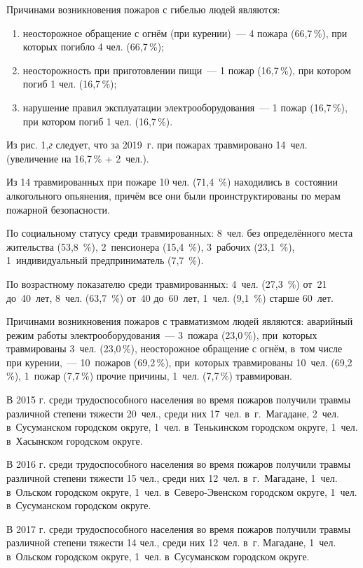 Причинами возникновения пожаров с гибелью людей являются:
\begin{enumerate}[noitemsep]\vspace{-8pt}
\item неосторожное обращение с огнём (при курении)~--- 4 пожара (66,7\,\%), при которых погибло 4 чел. (66,7\,\%);
\item неосторожность при приготовлении пищи~--- 1 пожар (16,7\,\%), при котором погиб 1 чел. (16,7\,\%);
\item нарушение правил эксплуатации электрооборудования~--- 1 пожар (16,7\,\%), при котором погиб 1 чел. (16,7\,\%).
\end{enumerate}
\vspace{-6pt}

Из рис. 1,\textit{г} следует, что за 2019~г. при пожарах травмировано 14~чел. (увеличение на 16,7\,\% + 2~чел.).

Из 14 травмированных при пожаре 10 чел. (71,4~\%) находились в~состоянии
алкогольного опьянения, причём все они были проинструктированы по мерам
пожарной безопасности.

По социальному статусу среди травмированных: 8~чел. без определённого
места жительства (53,8~\%), 2~пенсионера (15,4~\%), 3~рабочих (23,1~\%), 1~индивидуальный предприниматель (7,7~\%).

По возрастному показателю среди травмированных: 4~чел. (27,3~\%) от~21 до~40~лет, 8~чел. (63,7~\%) от~40 до~60~лет, 1~чел. (9,1~\%) старше 60~лет.

Причинами возникновения пожаров с травматизмом людей являются: аварийный режим работы электрооборудования~--- 3~пожара (23,0\,\%), при~которых травмированы 3~чел. (23,0\,\%), неосторожное обращение с огнём, в~том числе при курении,~--- 10~пожаров (69,2\,\%), при~которых травмированы 10~чел. (69,2\,\%), 1~пожар (7,7\,\%) прочие причины, 1~чел. (7,7\,\%) травмирован.

В 2015 г. среди трудоспособного населения во время пожаров получили травмы различной степени тяжести 20~чел., среди них 17~чел. в~г.~Магадане, 2~чел. в~Сусуманском городском округе, 1~чел. в~Тенькинском городском округе, 1~чел. в~Хасынском городском округе.

В 2016 г. среди трудоспособного населения во время пожаров получили травмы различной степени тяжести 15 чел., среди них 12~чел. в~г.~Магадане, 1~чел. в~Ольском городском округе, 1~чел. в~Северо-Эвенском городском округе, 1~чел. в~Сусуманском городском округе.

В 2017 г. среди трудоспособного населения во время пожаров получили травмы различной степени тяжести 14 чел., среди них 12~чел. в~г. Магадане, 1~чел. в~Ольском городском округе, 1~чел. в~Сусуманском городском округе.

